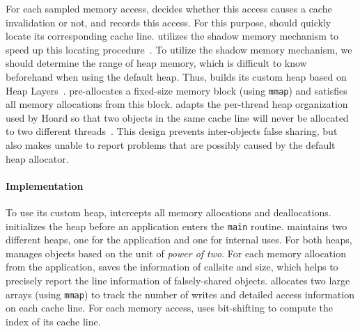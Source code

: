 For each sampled memory access, \cheetah{} decides whether this access causes a cache invalidation or not, and records this access. For this purpose, \cheetah{} should quickly locate its corresponding cache line. \Cheetah{} utilizes the shadow memory mechanism to speed up this locating procedure~\cite{qinzhao, Predator}. 
To utilize the shadow memory mechanism, we should determine the range of heap memory, which is difficult to know beforehand when using the default heap. Thus, \cheetah{} builds its custom heap based on Heap Layers~\cite{Berger:2001:CHM:378795.378821}. \cheetah{} pre-allocates a fixed-size memory block (using \texttt{mmap}) and satisfies all memory allocations from this block. \cheetah{} adapts the per-thread heap organization used by Hoard so that two objects in the same cache line will never be allocated to two different threads~\cite{Hoard}. This design prevents inter-objects false sharing, but also makes \cheetah{} unable to report problems that are possibly caused by the default heap allocator.  

\paragraph{Implementation} 
To use its custom heap, \cheetah{} intercepts all memory allocations and deallocations. \cheetah{} initializes the heap before an application enters the \texttt{main} routine. \cheetah{} maintains two different heaps, one for the application and one for internal uses. For both heaps, \cheetah{} manages objects based on the unit of {\it power of two}. For each memory allocation from the application, \cheetah{} saves the information of callsite and size, which helps \cheetah{} to precisely report the line information of falsely-shared objects.  
\Cheetah{} allocates two large arrays (using \texttt{mmap}) to track the number of writes and detailed access information on each cache line. For each memory access, \cheetah{} uses bit-shifting to compute the index of its cache line. 


